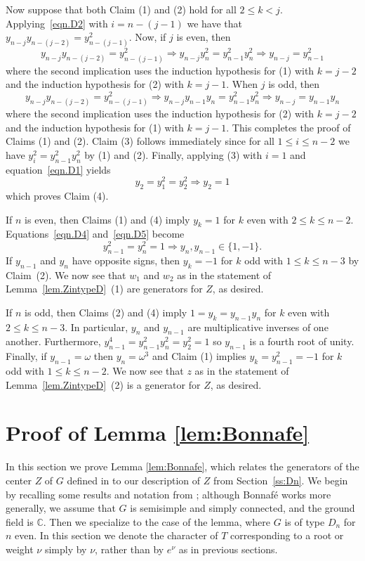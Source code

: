 \documentclass[reqno,11pt]{amsart}
\theoremstyle{remark}
\theoremstyle{remark}
\theoremstyle{definition}
\theoremstyle{definition}
\theoremstyle{definition}
\numberwithin{equation}{section}
\newcommand{\C}{\mathbb{C}}           %
\begin{document}
Now suppose that both Claim (1) and (2) hold for all $2 \leq k <j$. Applying~\eqref{eqn.D2} with $i=n-(j-1)$ we have that $y_{n-j}y_{n-(j-2)} = y_{n-(j-1)}^2 $. Now, if $j$ is even, then
\[
y_{n-j}y_{n-(j-2)} = y_{n-(j-1)}^2 \Rightarrow y_{n-j}y_n^2 = y_{n-1}^2y_n^2 \Rightarrow y_{n-j} = y_{n-1}^2
\]
where the second implication uses the induction hypothesis for (1) with $k=j-2$ and the induction hypothesis for (2) with $k=j-1$. When $j$ is odd, then 
\[
y_{n-j}y_{n-(j-2)} = y_{n-(j-1)}^2 \Rightarrow  y_{n-j} y_{n-1}y_n = y_{n-1}^2y_n^2 \Rightarrow y_{n-j} = y_{n-1}y_n
\]
where the second implication uses the induction hypothesis for (2) with $k=j-2$ and the induction hypothesis for (1) with $k=j-1$. 
This completes the proof of Claims (1) and (2).  Claim (3) follows immediately since for all $1\leq i\leq n-2$ we have $y_i^2 = y_{n-1}^2y_n^2$ by (1) and (2). Finally, applying (3) with $i=1$ and equation~\eqref{eqn.D1} yields
\[
y_2=y_1^2=y_2^2 \Rightarrow y_2=1
\]
which proves Claim (4).

If $n$ is even, then Claims (1) and (4) imply $y_k=1$ for $k$ even with $2\leq k \leq n-2$.  Equations~\eqref{eqn.D4} and~\eqref{eqn.D5} become
\[
y_{n-1}^2 = y_n^2 = 1\Rightarrow y_n, y_{n-1}\in \{1, -1\}.
\]
If $y_{n-1}$ and $y_n$ have opposite signs, then $y_k=-1$ for $k$ odd with $1\leq k \leq n-3$ by Claim~(2). We now see that $w_1$ and $w_2$ as in the statement of Lemma~\ref{lem.ZintypeD}~(1) are generators for $Z$, as desired. 

If $n$ is odd, then Claims (2) and (4) imply $1 = y_k= y_{n-1}y_n$ for $k$ even with $2\leq k \leq n-3$. In particular, $y_n$ and $y_{n-1}$ are multiplicative inverses of one another.  Furthermore, $y_{n-1}^4 = y_{n-1}^2 y_n^2 = y_2^2 = 1$ so $y_{n-1}$ is a fourth root of unity.  Finally, if $y_{n-1} = \omega$ then $y_n=\omega^3$ and Claim (1) implies $y_k = y_{n-1}^2 = -1$ for $k$ odd with $1\leq k \leq n-2$.  We now see that $z$ as in the statement of Lemma~\ref{lem.ZintypeD}~(2) is a generator for $Z$, as desired. 




\section{Proof of Lemma \ref{lem:Bonnafe}} \label{appendix.Bonnafe}
In this section we prove Lemma \ref{lem:Bonnafe}, which relates the generators of the center $Z$ of $G$ defined in \cite{Bonnafe2004} to our description of $Z$ from Section~\ref{ss:Dn}.   
We begin by recalling some results and notation from \cite{Bonnafe2004}; although Bonnaf\'e works more generally, we assume that
$G$ is semisimple and simply connected, and the ground field is $\C$.  Then we specialize to the case of the lemma, where $G$ is of type
$D_n$ for $n$ even.  In this section we denote the character of $T$ corresponding to a root or weight $\nu$ simply by $\nu$, rather
than by $e^{\nu}$ as in previous sections.
\end{document}
